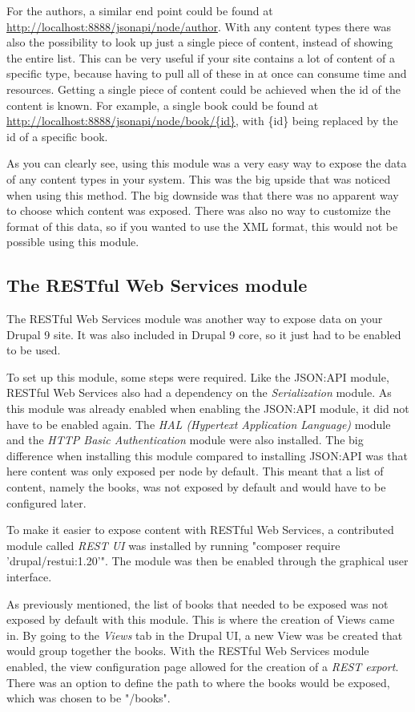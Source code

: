For the authors, a similar end point could be found at \url{http://localhost:8888/jsonapi/node/author}. With any content types there was also the possibility to look up just a single piece of content, instead of showing the entire list. This can be very useful if your site contains a lot of content of a specific type, because having to pull all of these in at once can consume time and resources. Getting a single piece of content could be achieved when the id of the content is known. For example, a single book could be found at \url{http://localhost:8888/jsonapi/node/book/{id}}, with \{id\} being replaced by the id of a specific book.

As you can clearly see, using this module was a very easy way to expose the data of any content types in your system. This was the big upside that was noticed when using this method. The big downside was that there was no apparent way to choose which content was exposed. There was also no way to customize the format of this data, so if you wanted to use the XML format, this would not be possible using this module.


\subsection{The  RESTful Web Services module}

The RESTful Web Services module was another way to expose data on your Drupal 9 site. It was also included in Drupal 9 core, so it just had to be enabled to be used.

To set up this module, some steps were required. Like the JSON:API module, RESTful Web Services also had a dependency on the \emph{Serialization} module. As this module was already enabled when enabling the JSON:API module, it did not have to be enabled again. The \emph{HAL (Hypertext Application Language)} module and the \emph{HTTP Basic Authentication} module were also installed. The big difference when installing this module compared to installing JSON:API was that here content was only exposed per node by default. This meant that a list of content, namely the books, was not exposed by default and would have to be configured later.

To make it easier to expose content with RESTful Web Services, a contributed module called \emph{REST UI} was installed by running "composer require 'drupal/restui:1.20'". The module was then be enabled through the graphical user interface.

As previously mentioned, the list of books that needed to be exposed was not exposed by default with this module. This is where the creation of Views came in. By going to the \emph{Views} tab in the Drupal UI, a new View was be created that would group together the books. With the RESTful Web Services module enabled, the view configuration page allowed for the creation of a \emph{REST export}. There was an option to define the path to where the books would be exposed, which was chosen to be "/books". 

